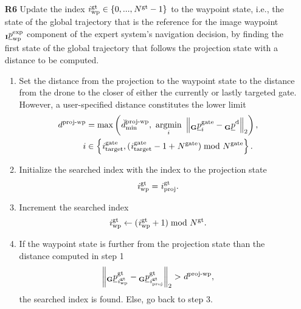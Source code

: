 \begin{itemize}
    \item [\textbf{R6}] 
    Update the index 
    $\idx[]{\glotraj}{\wayp}{}{} \in \{0, ..., \num[]{\glotraj}{}{}{} - 1\}$
    to the waypoint state,
    i.e., the state of the global trajectory
    that is the reference for the image waypoint
    $\pos[]{\expert}{\wayp}{\irs}{}$
    component of the expert system's navigation decision,
    by finding the first state of the global trajectory 
    that follows the projection state
    with a distance to be computed.
    \begin{enumerate}
        \item Set the distance from the projection to the waypoint state
        to the distance from the drone to the closer of
        either the currently or lastly targeted gate.
        However, a user-specified distance constitutes the lower limit
        \begin{align}
            \dist[]{\projtowayp}{}{}{} &= 
            \maxof{
                \dist[\user]{\projtowayp}{\mnm}{}{}
            }{
                \argmin{i} \left\| 
                    \pos[]{\gate}{i}{\grs}{} 
                    - 
                    \pos[]{\drone}{}{\grs}{}
                \right\|_2
            }, 
            \\
            i &\in \left\{ \idx[]{\gate}{\target}{}{}, 
            (\idx[]{\gate}{\target}{}{} - 1 + \num[]{\gate}{}{}{}) 
            \bmod 
            \num[]{\gate}{}{}{}
            \right\}
            .
        \end{align}
        \item Initialize the searched index with the index to the projection state
        \begin{equation}
            \idx[]{\glotraj}{\wayp}{}{} = \idx[]{\glotraj}{\proj}{}{}.
        \end{equation}
        \item Increment the searched index
        \begin{equation}
            \idx[]{\glotraj}{\wayp}{}{} \leftarrow (\idx[]{\glotraj}{\wayp}{}{} + 1) 
            \bmod \num[]{\glotraj}{}{}{}.
        \end{equation}
        \item If the waypoint state is further from the projection state 
        than the distance computed in step 1
        \begin{equation}
            \left\| 
                \pos[]{\glotraj}{\idx[]{\glotraj}{\wayp}{}{}}{\grs}{}
                - 
                \pos[]{\glotraj}{\idx[]{\glotraj}{\proj}{}{}}{\grs}{}
            \right\|_2
            > 
            \dist[]{\projtowayp}{}{}{},
        \end{equation}
        the searched index is found.
        Else, go back to step 3.
    \end{enumerate}



\end{itemize}

